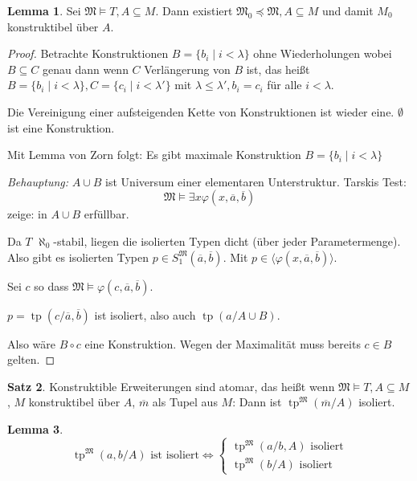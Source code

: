 \documentclass[12pt,parskip=full]{scrartcl}
\theoremstyle{definition}
\newtheorem{theorem}{Satz}[section]
\newtheorem{lemma}[theorem]{Lemma}
\begin{document}
 	\begin{lemma}
 		Sei $\mathfrak{M} \models T, A \subseteq M$. Dann existiert $\mathfrak{M_0} \preccurlyeq \mathfrak{M}, A \subseteq M$ und damit $M_0$ konstruktibel über $A$.
 	\end{lemma}
 
 	\begin{proof}
 		Betrachte Konstruktionen $B = \{ b_i \mid i < \lambda \}$ ohne Wiederholungen wobei $B \subseteq C$ genau dann wenn $C$ Verlängerung von $B$ ist, das heißt $B = \{ b_i \mid i < \lambda \}, C = \{ c_i \mid i < \lambda' \}$ mit $\lambda \leq \lambda', b_i = c_i$ für alle $i < \lambda$.
 		
 		Die Vereinigung einer aufsteigenden Kette von Konstruktionen ist wieder eine. $\emptyset$ ist eine Konstruktion.
 		
 		Mit Lemma von Zorn folgt: Es gibt maximale Konstruktion $B = \{ b_i \mid i < \lambda \}$
 		
 		\textit{Behauptung:} $A \cup B$ ist Universum einer elementaren Unterstruktur. Tarskis Test:
 		\begin{equation*}
	 		\mathfrak{M} \models \exists x \varphi(x, \overline{a}, \overline{b})
 		\end{equation*}
 		zeige: in $A \cup B$ erfüllbar.
 		
 		Da $T$ $\aleph_0$-stabil, liegen die isolierten Typen dicht (über jeder Parametermenge). Also gibt es isolierten Typen $p \in S_1^\mathfrak{M}(\overline{a}, \overline{b})$. Mit $p \in \langle \varphi(x, \overline{a}, \overline{b}) \rangle$.
 		
 		Sei $c$ so dass $\mathfrak{M} \models \varphi(c, \overline{a}, \overline{b})$.
 		
 		$p = \operatorname{tp}(c/ \overline{a}, \overline{b})$ ist isoliert, also auch $\operatorname{tp}(a / A \cup B)$.
 		
 		Also wäre $B \circ c$ eine Konstruktion. Wegen der Maximalität muss bereits $c \in B$ gelten.
 	\end{proof}
 
 	\begin{theorem}
 		Konstruktible Erweiterungen sind atomar, das heißt wenn $\mathfrak{M} \models T, A \subseteq M$, $M$ konstruktibel über $A$, $\overline{m}$ als Tupel aus $M$: Dann ist $\operatorname{tp}^{\mathfrak{M}}(\overline{m}/A)$ isoliert.
 	\end{theorem}
 
 	\begin{lemma}
 		\begin{equation*}
	 		\operatorname{tp}^\mathfrak{M}(a,b/A) \text{ ist isoliert} \Leftrightarrow \begin{cases}
		 		\operatorname{tp}^\mathfrak{M}(a/b,A) \text{ isoliert} \\
		 		\operatorname{tp}^\mathfrak{M}(b/A) \text{ isoliert}
	 		\end{cases}
 		\end{equation*}
 	\end{lemma}
 
\end{document}
